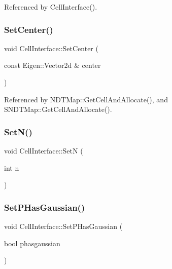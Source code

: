 Referenced by Cell\+Interface().

\mbox{\label{classCellInterface_ac566923857bbfb7f6cf9c69bc8efd241}} 
\subsubsection{\texorpdfstring{Set\+Center()}{SetCenter()}}
{\footnotesize\ttfamily void Cell\+Interface\+::\+Set\+Center (\begin{DoxyParamCaption}\item[{const Eigen\+::\+Vector2d \&}]{center }\end{DoxyParamCaption})\hspace{0.3cm}{\ttfamily [inline]}}



Referenced by N\+D\+T\+Map\+::\+Get\+Cell\+And\+Allocate(), and S\+N\+D\+T\+Map\+::\+Get\+Cell\+And\+Allocate().

\mbox{\label{classCellInterface_af19ae9871342b22b3a3fb59c850cff8b}} 
\subsubsection{\texorpdfstring{Set\+N()}{SetN()}}
{\footnotesize\ttfamily void Cell\+Interface\+::\+SetN (\begin{DoxyParamCaption}\item[{int}]{n }\end{DoxyParamCaption})\hspace{0.3cm}{\ttfamily [inline]}}

\mbox{\label{classCellInterface_a9128ca32285aa988cea84164ba08096b}} 
\subsubsection{\texorpdfstring{Set\+P\+Has\+Gaussian()}{SetPHasGaussian()}}
{\footnotesize\ttfamily void Cell\+Interface\+::\+Set\+P\+Has\+Gaussian (\begin{DoxyParamCaption}\item[{bool}]{phasgaussian }\end{DoxyParamCaption})\hspace{0.3cm}{\ttfamily [inline]}}

